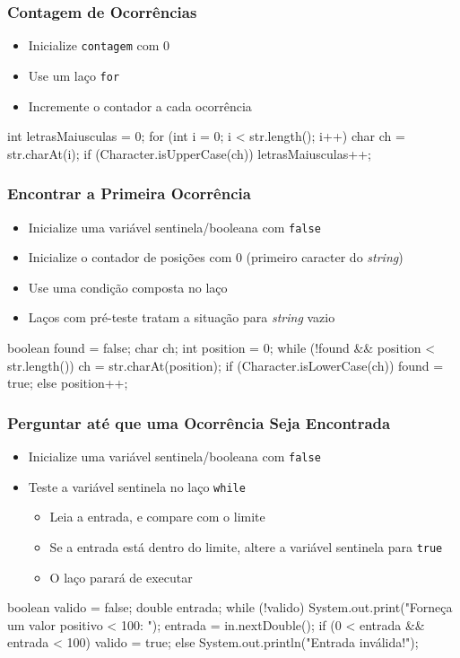 \documentclass[xcolor={dvipsnames,table},aspectratio=169]{beamer}
\begin{document}
\begin{frame}[fragile]\frametitle{Contagem de Ocorrências}
\begin{itemize}
	\item Inicialize \texttt{contagem} com 0
	\item Use um laço \texttt{for}
	\item Incremente o contador a cada ocorrência
\end{itemize}
\begin{javacode}
int letrasMaiusculas = 0;
for (int i = 0; i < str.length(); i++) {
   char ch = str.charAt(i);
   if (Character.isUpperCase(ch)) {
      letrasMaiusculas++;
   }
}
\end{javacode}
\end{frame}

\begin{frame}[fragile]\frametitle{Encontrar a Primeira Ocorrência}
\begin{itemize}
	\item Inicialize uma variável sentinela/booleana com \texttt{false}
	\item Inicialize o contador de posições com 0 (primeiro caracter do \emph{string})
	\item Use uma condição composta no laço
	\item Laços com pré-teste tratam a situação para \emph{string} vazio
\end{itemize}
{\footnotesize
\begin{javacode}
boolean found = false;
char ch;
int position = 0;
while (!found && position < str.length()) {
   ch = str.charAt(position);
   if (Character.isLowerCase(ch)) { 
      found = true; 
   }
   else { position++; }
}
\end{javacode}
}
\end{frame}

\begin{frame}[fragile]\frametitle{Perguntar até que uma Ocorrência Seja Encontrada}
\begin{itemize}
	\item Inicialize uma variável sentinela/booleana com \texttt{false}
	\item Teste a variável sentinela no laço \texttt{while}
	\begin{itemize}
		\item Leia a entrada, e compare com o limite
		\item Se a entrada está dentro do limite, altere a variável sentinela para \texttt{true}
		\item O laço parará de executar
	\end{itemize}
\end{itemize}
{\footnotesize
\begin{javacode}
boolean valido = false;
double entrada;
while (!valido) {
   System.out.print("Forneça um valor positivo < 100: ");
   entrada = in.nextDouble();
   if (0 < entrada && entrada < 100) { valido = true; }
   else { System.out.println("Entrada inválida!"); }
}
\end{javacode}
}
\end{frame}
\end{document}
